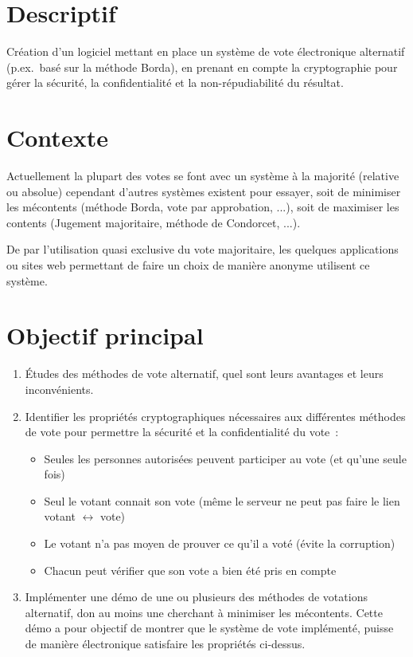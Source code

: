 \documentclass[../report]{subfiles}
\begin{document}
\section{Descriptif}
Création d'un logiciel mettant en place un système de vote électronique alternatif (p.ex.~basé sur la méthode Borda), en prenant en compte la cryptographie pour gérer la sécurité, la confidentialité et la non-répudiabilité du résultat.

\section{Contexte}
Actuellement la plupart des votes se font avec un système à la majorité (relative ou absolue) cependant d'autres systèmes existent pour essayer, soit de minimiser les mécontents (méthode Borda, vote par approbation, ...), soit de maximiser les contents (Jugement majoritaire, méthode de Condorcet, ...).

De par l'utilisation quasi exclusive du vote majoritaire, les quelques applications ou sites web permettant de faire un choix de manière anonyme utilisent ce système.

\section{Objectif principal}
\begin{enumerate}
  \item Études des méthodes de vote alternatif, quel sont leurs avantages et leurs inconvénients.
  \item Identifier les propriétés cryptographiques nécessaires aux différentes méthodes de vote pour permettre la sécurité et la confidentialité du vote~:
    \begin{itemize}
      \item Seules les personnes autorisées peuvent participer au vote (et qu'une seule fois)
      \item Seul le votant connait son vote (même le serveur ne peut pas faire le lien votant $\longleftrightarrow$ vote)
      \item Le votant n'a pas moyen de prouver ce qu'il a voté (évite la corruption)
      \item Chacun peut vérifier que son vote a bien été pris en compte
    \end{itemize}
  \item Implémenter une démo de une ou plusieurs des méthodes de votations alternatif, don au moins une cherchant à minimiser les mécontents. Cette démo a pour objectif de montrer que le système de vote implémenté, puisse de manière électronique satisfaire les propriétés ci-dessus.
\end{enumerate}
\end{document}
